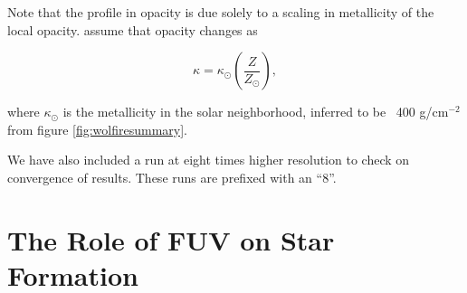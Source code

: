 Note that the profile in opacity is due solely to a scaling in metallicity of the local opacity. \citet{wolfireEt03} assume that opacity changes as

\begin{equation}
\kappa = \kappa_{\odot}\left(\frac{Z}{Z_{\odot}}\right),
\end{equation}

where $\kappa_{\odot}$ is the metallicity in the solar neighborhood, inferred to be ~400 g/cm$^{-2}$ from figure \ref{fig:wolfiresummary}.

We have also included a run at eight times higher resolution to check on convergence of results. These runs are prefixed with an ``8''.

\section{The Role of FUV on Star Formation}
\label{sec:fuvsfr}



